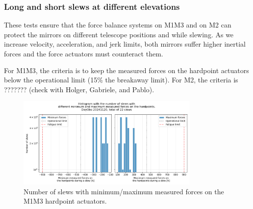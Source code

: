 \subsubsection{Long and short slews at different elevations}
\label{subsubsec:long_and_short_slews}

These tests ensure that the force balance systems on M1M3 and on M2 can protect
the mirrors on different telescope positions and while slewing. As we increase
velocity, acceleration, and jerk limits, both mirrors suffer higher inertial
forces and the force actuators must counteract them.

For M1M3, the criteria is to keep the measured forces on the hardpoint actuators
below the operational limit (15\% the breakaway limit). For M2, the criteria is
??????? (check with Holger, Gabriele, and Pablo).




\begin{figure}
    \centering
    \includegraphics[width=0.8\textwidth]{spa/10_vel_acc_jerk/M1M3_short_long_slews_10_histogram.png}
    \caption{Number of slews with minimum/maximum measured forces on the M1M3 hardpoint actuators.}
    \label{fig:m1m3_short_long_slews}
    \end{figure}

